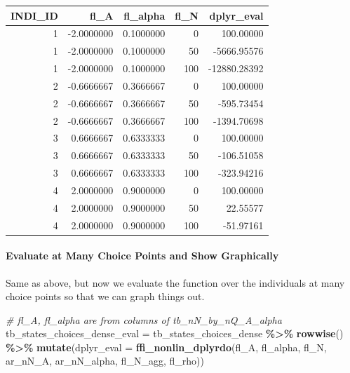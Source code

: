 \documentclass[
]{book}
\newenvironment{Shaded}{\begin{snugshade}}{\end{snugshade}}
\newcommand{\CommentTok}[1]{\textcolor[rgb]{0.56,0.35,0.01}{\textit{#1}}}
\newcommand{\DataTypeTok}[1]{\textcolor[rgb]{0.13,0.29,0.53}{#1}}
\newcommand{\KeywordTok}[1]{\textcolor[rgb]{0.13,0.29,0.53}{\textbf{#1}}}
\newcommand{\NormalTok}[1]{#1}
\newcommand{\OperatorTok}[1]{\textcolor[rgb]{0.81,0.36,0.00}{\textbf{#1}}}
\newcommand{\StringTok}[1]{\textcolor[rgb]{0.31,0.60,0.02}{#1}}
\begin{document}
\begin{table}[!h]
\centering
\begin{tabular}{r|r|r|r|r}
\hline
INDI\_ID & fl\_A & fl\_alpha & fl\_N & dplyr\_eval\\
\hline
\rowcolor{gray!6}  1 & -2.0000000 & 0.1000000 & 0 & 100.00000\\
\hline
1 & -2.0000000 & 0.1000000 & 50 & -5666.95576\\
\hline
\rowcolor{gray!6}  1 & -2.0000000 & 0.1000000 & 100 & -12880.28392\\
\hline
2 & -0.6666667 & 0.3666667 & 0 & 100.00000\\
\hline
\rowcolor{gray!6}  2 & -0.6666667 & 0.3666667 & 50 & -595.73454\\
\hline
2 & -0.6666667 & 0.3666667 & 100 & -1394.70698\\
\hline
\rowcolor{gray!6}  3 & 0.6666667 & 0.6333333 & 0 & 100.00000\\
\hline
3 & 0.6666667 & 0.6333333 & 50 & -106.51058\\
\hline
\rowcolor{gray!6}  3 & 0.6666667 & 0.6333333 & 100 & -323.94216\\
\hline
4 & 2.0000000 & 0.9000000 & 0 & 100.00000\\
\hline
\rowcolor{gray!6}  4 & 2.0000000 & 0.9000000 & 50 & 22.55577\\
\hline
4 & 2.0000000 & 0.9000000 & 100 & -51.97161\\
\hline
\end{tabular}
\end{table}

\hypertarget{evaluate-at-many-choice-points-and-show-graphically}{%
\paragraph{Evaluate at Many Choice Points and Show Graphically}\label{evaluate-at-many-choice-points-and-show-graphically}}

Same as above, but now we evaluate the function over the individuals at many choice points so that we can graph things out.

\begin{Shaded}
\begin{Highlighting}[]
\CommentTok{\# fl\_A, fl\_alpha are from columns of tb\_nN\_by\_nQ\_A\_alpha}
\NormalTok{tb\_states\_choices\_dense\_eval =}\StringTok{ }\NormalTok{tb\_states\_choices\_dense }\OperatorTok{\%\textgreater{}\%}\StringTok{ }\KeywordTok{rowwise}\NormalTok{() }\OperatorTok{\%\textgreater{}\%}
\StringTok{                        }\KeywordTok{mutate}\NormalTok{(}\DataTypeTok{dplyr\_eval =} \KeywordTok{ffi\_nonlin\_dplyrdo}\NormalTok{(fl\_A, fl\_alpha, fl\_N,}
\NormalTok{                                                               ar\_nN\_A, ar\_nN\_alpha,}
\NormalTok{                                                               fl\_N\_agg, fl\_rho))}
\end{Highlighting}
\end{Shaded}
\end{document}
